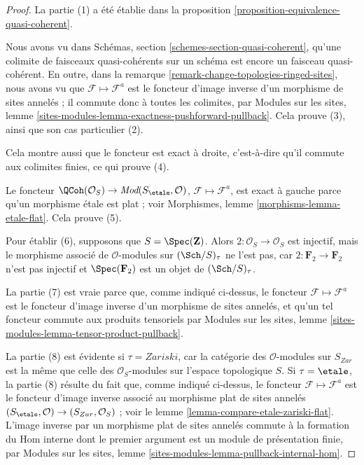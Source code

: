\begin{proof}
La partie (1) a été établie dans la
proposition \ref{proposition-equivalence-quasi-coherent}.

\medskip\noindent
Nous avons vu dans Schémas, section
\ref{schemes-section-quasi-coherent}, qu'une colimite de faisceaux
quasi-cohérents sur un schéma est encore un faisceau quasi-cohérent.
En outre, dans la remarque
\ref{remark-change-topologies-ringed-sites}, nous avons vu que
$\mathcal{F} \mapsto \mathcal{F}^a$ est le foncteur d'image inverse d'un
morphisme de sites annelés ; il commute donc à toutes les colimites, par
Modules sur les sites, lemme
\ref{sites-modules-lemma-exactness-pushforward-pullback}.
Cela prouve (3), ainsi que son cas particulier (2).

\medskip\noindent
Cela montre aussi que le foncteur est exact à droite, c'est-à-dire qu'il
commute aux colimites finies, ce qui prouve (4).

\medskip\noindent
Le foncteur $\QCoh(\mathcal{O}_S) \to
\textit{Mod}(S_\etale, \mathcal{O})$,
$\mathcal{F} \mapsto \mathcal{F}^a$, est exact à gauche parce qu'un
morphisme \'etale est plat ; voir Morphismes, lemme
\ref{morphisms-lemma-etale-flat}. Cela prouve (5).

\medskip\noindent
Pour établir (6), supposons que $S = \Spec(\mathbf{Z})$.
Alors $2 : \mathcal{O}_S \to \mathcal{O}_S$ est injectif, mais le morphisme
associé de $\mathcal{O}$-modules sur $(\Sch/S)_\tau$ ne l'est pas, car
$2 : \mathbf{F}_2 \to \mathbf{F}_2$ n'est pas injectif et
$\Spec(\mathbf{F}_2)$ est un objet de $(\Sch/S)_\tau$.

\medskip\noindent
La partie (7) est vraie parce que, comme indiqué ci-dessus, le foncteur
$\mathcal{F} \mapsto \mathcal{F}^a$ est le foncteur d'image inverse d'un
morphisme de sites annelés, et qu'un tel foncteur commute aux produits
tensoriels par Modules sur les sites, lemme
\ref{sites-modules-lemma-tensor-product-pullback}.

\medskip\noindent
La partie (8) est évidente si $\tau = Zariski$, car la catégorie des
$\mathcal{O}$-modules sur $S_{Zar}$ est la même que celle des
$\mathcal{O}_S$-modules sur l'espace topologique $S$.
Si $\tau = \etale$, la partie (8) résulte du fait que, comme indiqué
ci-dessus, le foncteur $\mathcal{F} \mapsto \mathcal{F}^a$ est le foncteur
d'image inverse associé au morphisme plat de sites annelés
$(S_\etale, \mathcal{O}) \to (S_{Zar}, \mathcal{O}_S)$ ; voir le
lemme \ref{lemma-compare-etale-zariski-flat}. L'image inverse par un
morphisme plat de sites annelés commute à la formation du Hom interne dont
le premier argument est un module de présentation finie, par Modules sur
les sites, lemme
\ref{sites-modules-lemma-pullback-internal-hom}.


\end{proof}

